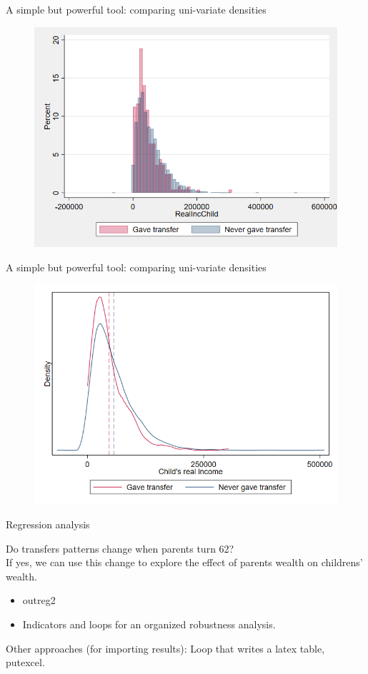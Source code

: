 \documentclass[10pt]{beamer}
\begin{document}
\begin{frame}{A simple but powerful tool: comparing uni-variate densities}

\begin{figure}[h!]
  \includegraphics[width=.8\textwidth]{Hist2.png}
\end{figure}%
    
\end{frame}


\begin{frame}{A simple but powerful tool: comparing uni-variate densities}

\begin{figure}[h!]
  \includegraphics[width=.8\textwidth]{DensityComparison.png}
\end{figure}%
    
\end{frame}

\begin{frame}{Regression analysis}

Do transfers patterns change when parents turn 62?\\
\bigskip
If yes, we can use this change to explore the effect of parents wealth on childrens' wealth.\\
\begin{itemize}
    \item outreg2
    \item Indicators and loops for an organized robustness analysis.
\end{itemize}
\bigskip
Other approaches (for importing results): Loop that writes a latex table, putexcel.

    
\end{frame}
\end{document}
